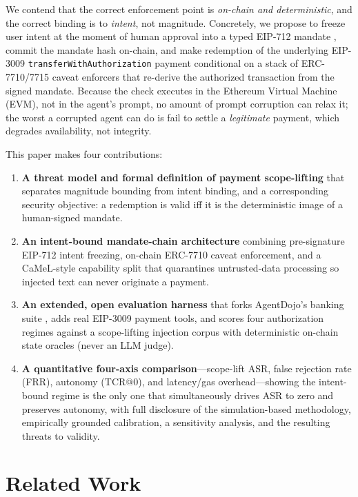 \documentclass[10pt,twocolumn,letterpaper]{article}
\begin{document}
We contend that the correct enforcement point is \emph{on-chain and deterministic}, and the correct binding is to \emph{intent}, not magnitude. Concretely, we propose to freeze user intent at the moment of human approval into a typed EIP-712 mandate \cite{eip712}, commit the mandate hash on-chain, and make redemption of the underlying EIP-3009 \texttt{transferWithAuthorization} \cite{eip3009} payment conditional on a stack of ERC-7710/7715 caveat enforcers \cite{erc7710,erc7715} that re-derive the authorized transaction from the signed mandate. Because the check executes in the Ethereum Virtual Machine (EVM), not in the agent's prompt, no amount of prompt corruption can relax it; the worst a corrupted agent can do is fail to settle a \emph{legitimate} payment, which degrades availability, not integrity.

This paper makes four contributions:

\begin{enumerate}
\item \textbf{A threat model and formal definition of payment scope-lifting} that separates magnitude bounding from intent binding, and a corresponding security objective: a redemption is valid iff it is the deterministic image of a human-signed mandate.
\item \textbf{An intent-bound mandate-chain architecture} combining pre-signature EIP-712 intent freezing, on-chain ERC-7710 caveat enforcement, and a CaMeL-style \cite{camel} capability split that quarantines untrusted-data processing so injected text can never originate a payment.
\item \textbf{An extended, open evaluation harness} that forks AgentDojo's banking suite \cite{agentdojo}, adds real EIP-3009 payment tools, and scores four authorization regimes against a scope-lifting injection corpus with deterministic on-chain state oracles (never an LLM judge).
\item \textbf{A quantitative four-axis comparison}---scope-lift ASR, false rejection rate (FRR), autonomy (TCR@0), and latency/gas overhead---showing the intent-bound regime is the only one that simultaneously drives ASR to zero and preserves autonomy, with full disclosure of the simulation-based methodology, empirically grounded calibration, a sensitivity analysis, and the resulting threats to validity.
\end{enumerate}

\section{Related Work}
\end{document}
